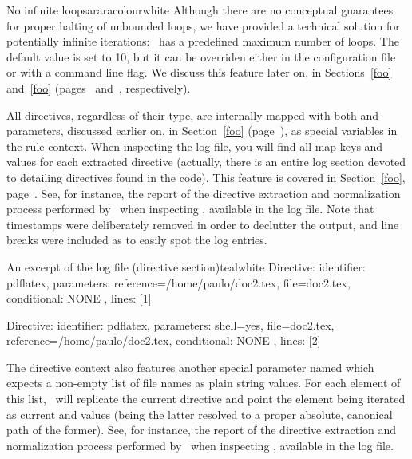 \begin{messagebox}{No infinite loops}{araracolour}{\icinfo}{white}
Although there are no conceptual guarantees for proper halting of unbounded loops, we have provided a technical solution for potentially infinite iterations: \arara\ has a predefined maximum number of loops. The default value is set to 10, but it can be overriden either in the configuration file or with a command line flag. We discuss this feature later on, in Sections~\ref{foo} and~\ref{foo} (pages~\pageref{foo} and~\pageref{foo}, respectively).
\end{messagebox}

All directives, regardless of their type, are internally mapped with both  and  parameters, discussed earlier on, in Section~\ref{foo} (page~\pageref{foo}), as special variables in the rule context. When inspecting the log file, you will find all map keys and values for each extracted directive (actually, there is an entire log section devoted to detailing directives found in the code). This feature is covered in Section~\ref{foo}, page~\pageref{foo}. See, for instance, the report of the directive extraction and normalization process performed by \arara\ when inspecting , available in the log file. Note that timestamps were deliberately removed in order to declutter the output, and line breaks were included as to easily spot the log entries.


\begin{codebox}{An excerpt of the log file (directive section)}{teal}{\icnote}{white}
Directive: { identifier: pdflatex, parameters:
{reference=/home/paulo/doc2.tex, file=doc2.tex},
conditional: { NONE }, lines: [1] }

Directive: { identifier: pdflatex, parameters:
{shell=yes, file=doc2.tex, reference=/home/paulo/doc2.tex},
conditional: { NONE }, lines: [2] }
\end{codebox}

The directive context also features another special parameter named  which expects a non-empty list of file names as plain string values. For each element of this list, \arara\ will replicate the current directive and point the element being iterated as current  and  values (being the latter resolved to a proper absolute, canonical path of the former). See, for instance, the report of the directive extraction and normalization process performed by \arara\ when inspecting , available in the log file.

